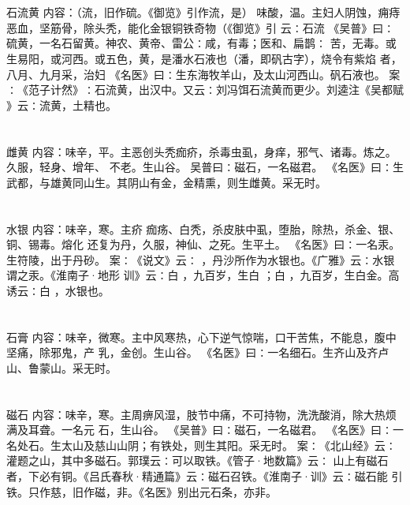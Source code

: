 \documentclass[12pt,UTF8]{ctexbook}
\begin{document}
\section{}石流黄
内容：（流，旧作硫。《御览》引作流，是） 
味酸，温。主妇人阴蚀，痈痔恶血，坚筋骨，除头秃，能化金银铜铁奇物（《御览》引 
云∶石流 
《吴普》曰∶硫黄，一名石留黄。神农、黄帝、雷公∶咸，有毒；医和、扁鹊∶ 
苦，无毒。或生易阳，或河西。或五色，黄，是潘水石液也（潘，即矾古字），烧令有紫焰 
者， 
八月、九月采，治妇 
《名医》曰∶生东海牧羊山，及太山河西山。矾石液也。 
案∶《范子计然》∶石流黄，出汉中。又云∶刘冯饵石流黄而更少。刘逵注《吴都赋 
》云∶流黄，土精也。 


\section{}雌黄
内容：味辛，平。主恶创头秃痂疥，杀毒虫虱，身痒，邪气、诸毒。炼之。久服，轻身、增年、 
不老。生山谷。 
吴普曰∶磁石，一名磁君。 
《名医》曰∶生武都，与雄黄同山生。其阴山有金，金精熏，则生雌黄。采无时。 


\section{}水银
内容：味辛，寒。主疥 痂疡、白秃，杀皮肤中虱，堕胎，除热，杀金、银、铜、锡毒。熔化 
还复为丹，久服，神仙、之死。生平土。 
《名医》曰∶一名汞。生符陵，出于丹砂。 
案∶《说文》云∶ ，丹沙所作为水银也。《广雅》云∶水银谓之汞。《淮南子·地形 
训》云∶白 ，九百岁，生白 ；白 ，九百岁，生白金。高诱云∶白 ，水银也。 


\section{}石膏
内容：味辛，微寒。主中风寒热，心下逆气惊喘，口干苦焦，不能息，腹中坚痛，除邪鬼，产 
乳，金创。生山谷。 
《名医》曰∶一名细石。生齐山及齐卢山、鲁蒙山。采无时。 


\section{}磁石
内容：味辛，寒。主周痹风湿，肢节中痛，不可持物，洗洗酸消，除大热烦满及耳聋。一名元 
石，生山谷。 
《吴普》曰∶磁石，一名磁君。 
《名医》曰∶一名处石。生太山及慈山山阴；有铁处，则生其阳。采无时。 
案∶《北山经》云∶灌题之山，其中多磁石。郭璞云∶可以取铁。《管子·地数篇》云∶ 
山上有磁石者，下必有铜。《吕氏春秋·精通篇》云∶磁石召铁。《淮南子·训》云∶磁石能 
引铁。只作慈，旧作磁，非。《名医》别出元石条，亦非。 
\end{document}
